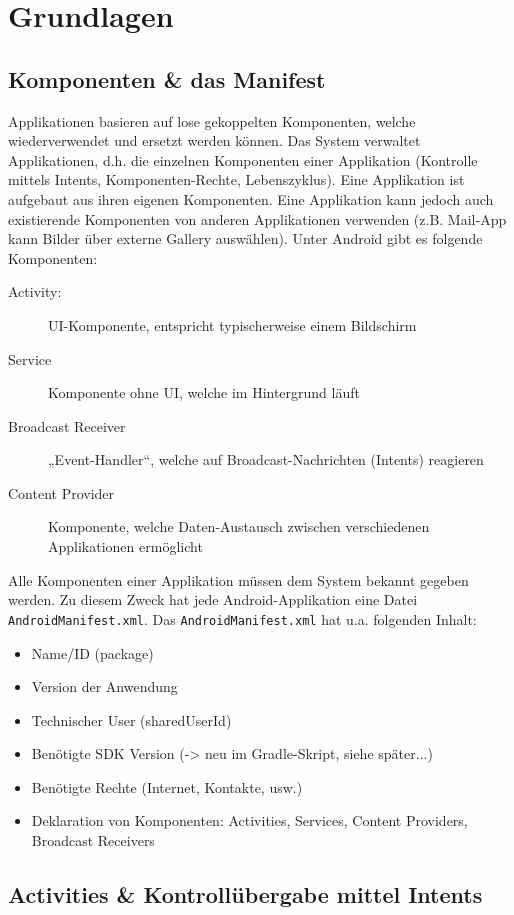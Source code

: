 \chapter{Grundlagen}

\section{Komponenten \& das Manifest}

Applikationen basieren auf lose gekoppelten Komponenten, welche wiederverwendet und ersetzt werden können. Das System verwaltet Applikationen, d.h. die einzelnen Komponenten einer Applikation (Kontrolle mittels Intents, Komponenten-Rechte, Lebenszyklus). Eine Applikation ist aufgebaut aus ihren eigenen Komponenten. Eine Applikation kann jedoch auch existierende Komponenten von anderen Applikationen verwenden (z.B. Mail-App kann Bilder über externe Gallery auswählen). Unter Android gibt es folgende Komponenten:
\begin{description}
	\item[Activity:] UI-Komponente, entspricht typischerweise einem Bildschirm
	\item[Service] Komponente ohne UI, welche im Hintergrund läuft
	\item[Broadcast Receiver] „Event-Handler“, welche auf Broadcast-Nachrichten (Intents) reagieren
	\item[Content Provider] Komponente, welche Daten-Austausch zwischen verschiedenen Applikationen ermöglicht
\end{description}
Alle Komponenten einer Applikation müssen dem System bekannt gegeben werden. Zu diesem Zweck hat jede Android-Applikation eine
Datei \texttt{AndroidManifest.xml}. Das \texttt{AndroidManifest.xml} hat u.a. folgenden Inhalt:
\begin{itemize}
	\item Name/ID (package)
	\item Version der Anwendung
	\item Technischer User (sharedUserId)
	\item Benötigte SDK Version (-> neu im Gradle-Skript, siehe später...)
	\item Benötigte Rechte (Internet, Kontakte, usw.)
	\item Deklaration von Komponenten: Activities, Services, Content Providers, Broadcast Receivers
\end{itemize}

\section{Activities \& Kontrollübergabe mittel Intents}


